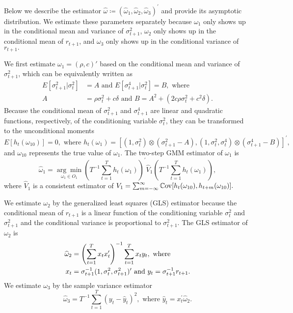 \documentclass[11pt, letterpaper, twoside]{article}
\begin{document}
Below we describe the estimator $\widehat{\omega } \coloneqq (\widehat{\omega }_{1}, \widehat{\omega }_{2},\widehat{\omega }_{3})^{\prime }$ and provide its asymptotic distribution. We estimate these parameters separately because $\omega _{1}$ only shows up in the conditional mean and variance of $\sigma _{t+1}^{2}$, $\omega_{2}$ only shows up in the conditional mean of $r_{t+1}$, and $\omega _{3}$ only shows up in the conditional variance of $
r_{t+1}.$

We first estimate $\omega _{1}=(\rho,c)'$ based on the conditional mean and variance of $\sigma _{t+1}^{2}$, which can be equivalently written as 
%
\begin{align}
    E[\sigma _{t+1}^{2}|\sigma _{t}^{2}] &= A\text{ and }E[\sigma _{t+1}^{4}|\sigma _{t}^{2}]=B,\text{ where }  \nonumber \\
%
    A &= \rho \sigma _{t}^{2}+c\delta \text{ and }B=A^{2}+\left( 2c\rho \sigma _{t}^{2}+c^{2}\delta \right) .
\end{align}
%
Because the conditional mean of $\sigma _{t+1}^{2}$ and $\sigma _{t+1}^{4}$ are linear and quadratic functions, respectively, of the conditioning variable $\sigma _{t}^{2}$, they can be transformed to the unconditional moments
%
\begin{equation}
    E[h_{t}(\omega _{10})]=0,\text{ where }h_{t}(\omega _{1})=[(1,\sigma _{t}^{2})\otimes (\sigma _{t+1}^{2}-A),(1,\sigma _{t}^{2},\sigma _{t}^{4})\otimes (\sigma _{t+1}^{4}-B)]^{\prime },
\end{equation}
%
and $\omega _{10}$ represents the true value of $\omega _{1}$. The two-step GMM estimator of $\omega _{1}$ is%
%
\begin{equation}
    \label{omega 1 est}
    \widehat{\omega }_{1}=\underset{\omega _{1}\in O_{1}}{\arg \min }\left( T^{-1}\sum_{t=1}^{T}h_{t}(\omega _{1})\right) ^{\prime }\widehat{V}_{1}\left( T^{-1}\sum_{t=1}^{T}h_{t}(\omega _{1})\right) ,
\end{equation}%
%
where $\widehat{V}_{1}$ is a consistent estimator of $V_{1}=\sum_{m=-\infty }^{\infty }\operatorname{\mathbb{C}ov}[h_{t}(\omega _{10}),h_{t+m}(\omega _{10})].$

We estimate $\omega _{2}$ by the generalized least squares (GLS) estimator because the conditional mean of $r_{t+1}$ is a linear function of the conditioning variable $\sigma _{t}^{2}$ and $\sigma _{t+1}^{2}$ and the conditional variance is proportional to $\sigma _{t+1}^{2}.$ The GLS estimator of $\omega _{2}$ is
%
\begin{align}
    \widehat{\omega }_{2} &= \left( \sum_{t=1}^{T}x_{t}x_{t}^{\prime }\right) ^{-1}\sum_{t=1}^{T}x_{t}y_{t},\text{ where }  \notag \\ 
%
    x_{t} &= \sigma _{t+1}^{-1}(1,\sigma _{t}^{2},\sigma _{t+1}^{2})^{\prime } \text{ and }y_{t}=\sigma _{t+1}^{-1}r_{t+1}.  \label{omega 2 est}
\end{align}
%
We estimate $\omega _{3}$ by the sample variance estimator
%
\begin{equation}
    \label{omega 3 est}
    \widehat{\omega }_{3}=T^{-1}\sum_{t=1}^{T}\left( y_{t}-\widehat{y}_{t}\right) ^{2},\text{ where }\widehat{y}_{t}=x_{t}^{\prime }\widehat{ \omega }_{2}.  
\end{equation}
\end{document}
